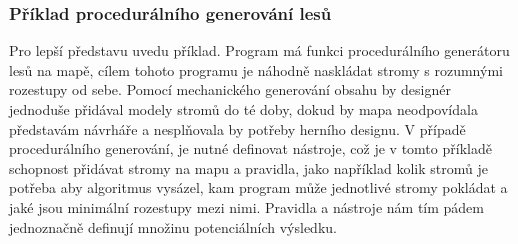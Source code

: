 \subsubsection{Příklad procedurálního generování lesů}
\label{proceduralExample}
Pro lepší představu uvedu příklad. Program má funkci procedurálního generátoru lesů na mapě, cílem tohoto programu je náhodně naskládat stromy s rozumnými rozestupy od sebe. Pomocí mechanického generování obsahu by designér jednoduše přidával modely stromů do té doby, dokud by mapa neodpovídala představám návrháře a nesplňovala by potřeby herního designu. V případě procedurálního generování, je nutné definovat nástroje, což je v tomto příkladě schopnost přidávat stromy na mapu a pravidla, jako například kolik stromů je potřeba aby algoritmus vysázel, kam program může jednotlivé stromy pokládat a jaké jsou minimální rozestupy mezi nimi. Pravidla a nástroje nám tím pádem jednoznačně definují množinu potenciálních výsledku.

